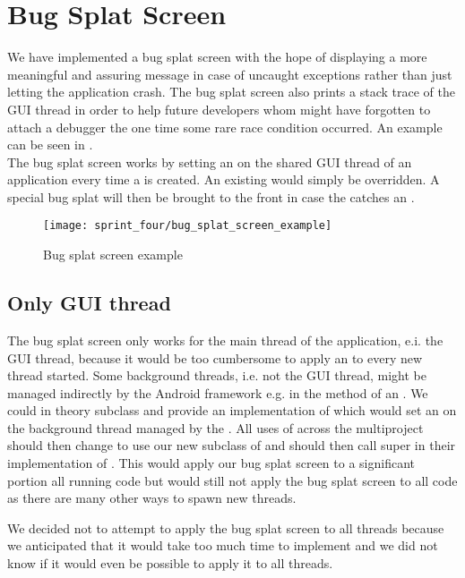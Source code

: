 
\section{Bug Splat Screen}
\label{sec:bug_splat_screen}

We have implemented a bug splat screen with the hope of displaying a more meaningful and assuring message in case of uncaught exceptions rather than just letting the application crash. The bug splat screen also prints a stack trace of the GUI thread in order to help future developers whom might have forgotten to attach a debugger the one time some rare race condition occurred. An example can be seen in .\\

The bug splat screen works by setting an  on the shared GUI thread of an application every time a  is created. An existing  would simply be overridden. A special bug splat  will then be brought to the front in case the  catches an .

\begin{figure}[!htbp]
        \centering
        \texttt{[image: sprint\_four/bug\_splat\_screen\_example]}
        \caption{Bug splat screen example}
        \label{fig:bug_splat_screen_example}
\end{figure}

\subsection{Only GUI thread} 
The bug splat screen only works for the main thread of the application, e.i. the GUI thread, because it would be too cumbersome to apply an  to every new thread started. Some background threads, i.e. not the GUI thread, might be managed indirectly by the Android framework e.g. in the  method of an . We could in theory subclass  and provide an implementation of  which would set an  on the background thread managed by the . All uses of  across the \giraf multiproject should then change to use our new subclass of  and should then call super in their implementation of . This would apply our bug splat screen to a significant portion all running code but would still not apply the bug splat screen to all code as there are many other ways to spawn new threads. 

We decided not to attempt to apply the bug splat screen to all threads because we anticipated that it would take too much time to implement and we did not know if it would even be possible to apply it to all threads.          
